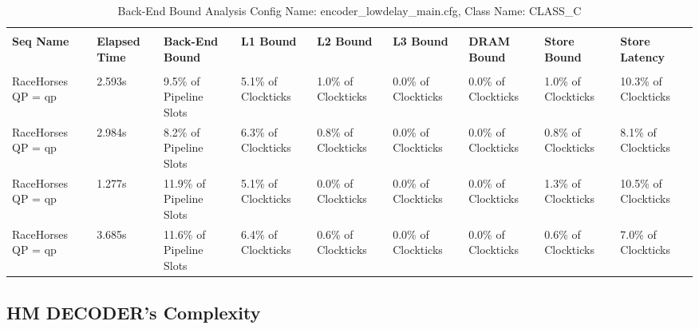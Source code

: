 \documentclass{article}%
\begin{document}
\begin{longtabu}{| X[l] | X[l] | X[l] | X[l] | X[l] | X[l] | X[l] | X[l] | X[l] |}%
\caption{%
Back{-}End Bound Analysis\newline%
 Config Name: encoder\_lowdelay\_main.cfg,\newline%
 Class Name: CLASS\_C\newline%
%
}%
\hline%
&&&&&&&&\\%
\textbf{Seq Name}&\textbf{Elapsed Time}&\textbf{Back{-}End Bound}&\textbf{L1 Bound}&\textbf{L2 Bound}&\textbf{L3 Bound}&\textbf{DRAM Bound}&\textbf{Store Bound}&\textbf{Store Latency}\\%
&&&&&&&&\\%
\hline%
\endhead%
RaceHorses\newline%
 QP = qp&2.593s&9.5\% of Pipeline Slots&5.1\% of Clockticks&1.0\% of Clockticks&0.0\% of Clockticks&0.0\% of Clockticks&1.0\% of Clockticks&10.3\% of Clockticks\\%
\hline%
RaceHorses\newline%
 QP = qp&2.984s&8.2\% of Pipeline Slots&6.3\% of Clockticks&0.8\% of Clockticks&0.0\% of Clockticks&0.0\% of Clockticks&0.8\% of Clockticks&8.1\% of Clockticks\\%
\hline%
RaceHorses\newline%
 QP = qp&1.277s&11.9\% of Pipeline Slots&5.1\% of Clockticks&0.0\% of Clockticks&0.0\% of Clockticks&0.0\% of Clockticks&1.3\% of Clockticks&10.5\% of Clockticks\\%
\hline%
RaceHorses\newline%
 QP = qp&3.685s&11.6\% of Pipeline Slots&6.4\% of Clockticks&0.6\% of Clockticks&0.0\% of Clockticks&0.0\% of Clockticks&0.6\% of Clockticks&7.0\% of Clockticks\\%
\hline%
\end{longtabu}%
\newpage

%
\subsection{HM DECODER's Complexity}%
\label{subsec:HMDECODERsComplexity}%
\end{document}
